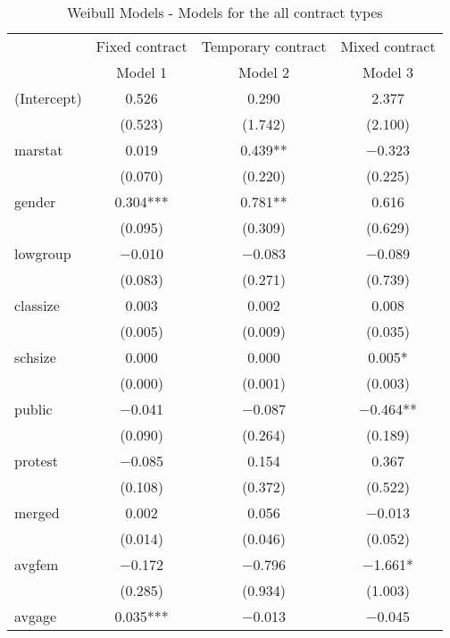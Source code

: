 \documentclass[
]{article}
\begin{document}
\begin{table}[!h]

\caption{\label{tab:unnamed-chunk-14}Weibull Models - Models for the all contract types}
\centering
\fontsize{8}{10}\selectfont
\begin{tabular}[t]{lccc}
\toprule
\multicolumn{1}{c}{ } & \multicolumn{1}{c}{Fixed contract } & \multicolumn{1}{c}{Temporary contract} & \multicolumn{1}{c}{Mixed contract} \\
\cmidrule(l{3pt}r{3pt}){2-2} \cmidrule(l{3pt}r{3pt}){3-3} \cmidrule(l{3pt}r{3pt}){4-4}
  & Model 1 & Model 2 & Model 3\\
\midrule
(Intercept) & \num{0.526} & \num{0.290} & \num{2.377}\\
 & (\num{0.523}) & (\num{1.742}) & (\num{2.100})\\
marstat & \num{0.019} & \num{0.439}** & \num{-0.323}\\
 & (\num{0.070}) & (\num{0.220}) & (\num{0.225})\\
gender & \num{0.304}*** & \num{0.781}** & \num{0.616}\\
 & (\num{0.095}) & (\num{0.309}) & (\num{0.629})\\
lowgroup & \num{-0.010} & \num{-0.083} & \num{-0.089}\\
 & (\num{0.083}) & (\num{0.271}) & (\num{0.739})\\
classize & \num{0.003} & \num{0.002} & \num{0.008}\\
 & (\num{0.005}) & (\num{0.009}) & (\num{0.035})\\
schsize & \num{0.000} & \num{0.000} & \num{0.005}*\\
 & (\num{0.000}) & (\num{0.001}) & (\num{0.003})\\
public & \num{-0.041} & \num{-0.087} & \num{-0.464}**\\
 & (\num{0.090}) & (\num{0.264}) & (\num{0.189})\\
protest & \num{-0.085} & \num{0.154} & \num{0.367}\\
 & (\num{0.108}) & (\num{0.372}) & (\num{0.522})\\
merged & \num{0.002} & \num{0.056} & \num{-0.013}\\
 & (\num{0.014}) & (\num{0.046}) & (\num{0.052})\\
avgfem & \num{-0.172} & \num{-0.796} & \num{-1.661}*\\
 & (\num{0.285}) & (\num{0.934}) & (\num{1.003})\\
avgage & \num{0.035}*** & \num{-0.013} & \num{-0.045}\\

\end{tabular}
\end{table}
\end{document}
